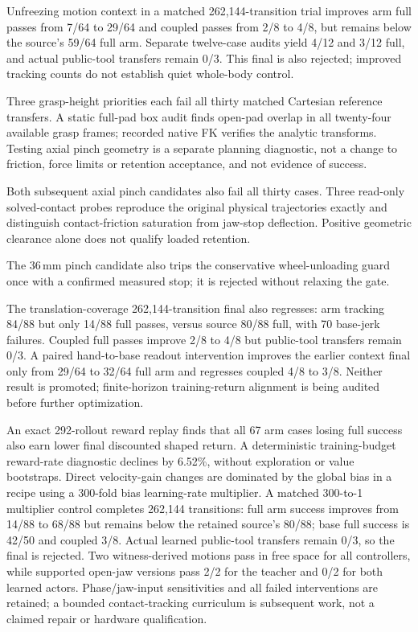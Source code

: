 Unfreezing motion context in a matched 262,144-transition trial improves arm
full passes from 7/64 to 29/64 and coupled passes from 2/8 to 4/8, but remains
below the source's 59/64 full arm. Separate twelve-case audits yield 4/12 and
3/12 full, and actual public-tool transfers remain 0/3. This final is also
rejected; improved tracking counts do not establish quiet whole-body control.

Three grasp-height priorities each fail all thirty matched Cartesian reference
transfers. A static full-pad box audit finds open-pad overlap in all twenty-four
available grasp frames; recorded native FK verifies the analytic transforms.
Testing axial pinch geometry is a separate planning diagnostic, not a change
to friction, force limits or retention acceptance, and not evidence of success.

Both subsequent axial pinch candidates also fail all thirty cases. Three
read-only solved-contact probes reproduce the original physical trajectories
exactly and distinguish contact-friction saturation from jaw-stop deflection.
Positive geometric clearance alone does not qualify loaded retention.

The 36\,mm pinch candidate also trips the conservative wheel-unloading guard
once with a confirmed measured stop; it is rejected without relaxing the gate.

The translation-coverage 262,144-transition final also regresses: arm tracking
84/88 but only 14/88 full passes, versus source 80/88 full, with 70 base-jerk
failures. Coupled full passes improve 2/8 to 4/8 but public-tool transfers
remain 0/3. A paired hand-to-base readout intervention improves the earlier
context final only from 29/64 to 32/64 full arm and regresses coupled 4/8 to
3/8. Neither result is promoted; finite-horizon training-return alignment is
being audited before further optimization.

An exact 292-rollout reward replay finds that all 67 arm cases losing full
success also earn lower final discounted shaped return. A deterministic
training-budget reward-rate diagnostic declines by 6.52\%, without exploration
or value bootstraps. Direct velocity-gain changes are dominated by the global
bias in a recipe using a 300-fold bias learning-rate multiplier. A matched
300-to-1 multiplier control completes 262,144 transitions: full arm success
improves from 14/88 to 68/88 but remains below the retained source's 80/88;
base full success is 42/50 and coupled 3/8. Actual learned public-tool transfers
remain 0/3, so the final is rejected. Two witness-derived motions pass in free
space for all controllers, while supported open-jaw versions pass 2/2 for the
teacher and 0/2 for both learned actors. Phase/jaw-input sensitivities and all
failed interventions are retained; a bounded contact-tracking curriculum is
subsequent work, not a claimed repair or hardware qualification.

